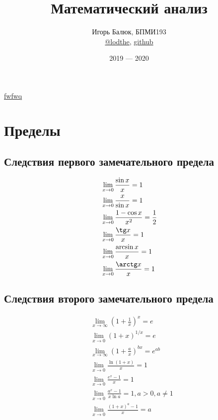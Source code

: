 \documentclass[12pt, a4paper]{article}
\title{Математический анализ}
\author{
	Игорь Балюк, БПМИ193 \\ 
	\href{https://teleg.run/lodthe}{@lodthe}, \href{https://github.com/LoDThe/hse-tex}{github}
}
\date{2019 --- 2020}
\begin{document}
	\maketitle
	\tableofcontents
	\newpage
	\href{https://github.com/LoDThe/hse-tex}{fwfwq}
	\section{Пределы}

	\subsection{Следствия первого замечательного предела}
	\begin{align*}
		&\lim_{x \to 0} \dfrac{\sin x}{x} = 1 \\
		&\lim_{x \to 0} \dfrac{x}{\sin x} = 1 \\
		&\lim_{x \to 0} \dfrac{1 - \cos x}{x^2} = \dfrac{1}{2} \\
		&\lim_{x \to 0} \dfrac{\tg x}{x} = 1 \\
		&\lim_{x \to 0} \dfrac{\arcsin x}{x} = 1 \\
		&\lim_{x \to 0} \dfrac{\arctg x}{x} = 1 \\
	\end{align*}

	\subsection{Следствия второго замечательного предела}
	\begin{align*}
		&\lim_{x \to \infty} \left(1 + \frac{1}{x}\right)^x = e \\
		&\lim_{x \to 0} \left(1 + x\right)^{1/x} = e \\
		&\lim_{x \to \infty} \left(1 + \frac{a}{x}\right)^{bx} = e^{ab} \\
		&\lim_{x \to 0} \frac{\ln (1 + x)}{x} = 1 \\
		&\lim_{x \to 0} \frac{e^x - 1}{x} = 1 \\
		&\lim_{x \to 0} \frac{a^x - 1}{x \ln a} = 1, a > 0, a \neq 1 \\
		&\lim_{x \to 0} \frac{(1 + x)^a - 1}{x} = a
	\end{align*}
\end{document}
